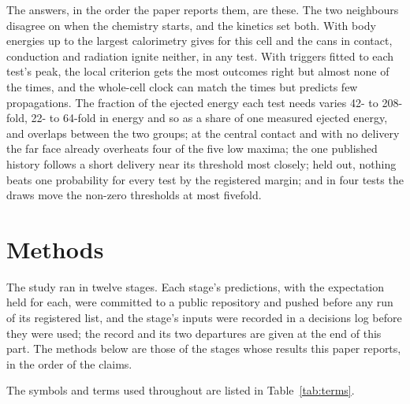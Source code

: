 \documentclass[preprint,12pt]{elsarticle}
\begin{document}
The answers, in the order the paper reports them, are these. The two neighbours disagree on when the chemistry starts, and the kinetics set both. With body energies up to the largest calorimetry gives for this cell and the cans in contact, conduction and radiation ignite neither, in any test. With triggers fitted to each test's peak, the local criterion gets the most outcomes right but almost none of the times, and the whole-cell clock can match the times but predicts few propagations. The fraction of the ejected energy each test needs varies 42- to 208-fold, 22- to 64-fold in energy and so as a share of one measured ejected energy, and overlaps between the two groups; at the central contact and with no delivery the far face already overheats four of the five low maxima; the one published history follows a short delivery near its threshold most closely; held out, nothing beats one probability for every test by the registered margin; and in four tests the draws move the non-zero thresholds at most fivefold.


\section{Methods}
\label{sec:methods}

The study ran in twelve stages. Each stage's predictions, with the expectation held for each, were committed to a public repository and pushed before any run of its registered list, and the stage's inputs were recorded in a decisions log before they were used; the record and its two departures are given at the end of this part. The methods below are those of the stages whose results this paper reports, in the order of the claims.

The symbols and terms used throughout are listed in Table~\ref{tab:terms}.
\end{document}
